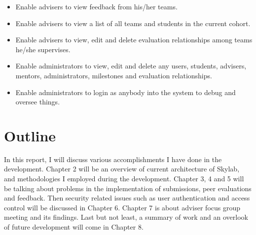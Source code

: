 \begin{itemize}
  \item Enable advisers to view feedback from his/her teams.
  \item Enable advisers to view a list of all teams and students in the current cohort.
  \item Enable advisers to view, edit and delete evaluation relationships among teams he/she supervises.
  \item Enable administrators to view, edit and delete any users, students, advisers, mentors, administrators, milestones and evaluation relationships.
  \item Enable administrators to login as anybody into the system to debug and oversee things.
\end{itemize}

\section{Outline}

In this report, I will discuss various accomplishments I have done in the development. Chapter 2 will be an overview of current architecture of Skylab, and methodologies I employed during the development. Chapter 3, 4 and 5 will be talking about problems in the implementation of submissions, peer evaluations and feedback. Then security related issues such as user authentication and access control will be discussed in Chapter 6. Chapter 7 is about adviser focus group meeting and its findings. Last but not least, a summary of work and an overlook of future development will come in Chapter 8.
